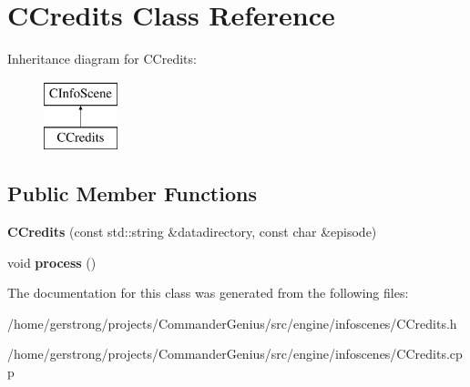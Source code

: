 \hypertarget{class_c_credits}{
\section{CCredits Class Reference}
\label{class_c_credits}
}
Inheritance diagram for CCredits:\begin{figure}[H]
\begin{center}
\leavevmode
\includegraphics[height=2cm]{class_c_credits}
\end{center}
\end{figure}
\subsection*{Public Member Functions}
\begin{DoxyCompactItemize}
\item 
\hypertarget{class_c_credits_acf94358ee383174aab4a5e1279a40e84}{
{\bfseries CCredits} (const std::string \&datadirectory, const char \&episode)}
\label{class_c_credits_acf94358ee383174aab4a5e1279a40e84}

\item 
\hypertarget{class_c_credits_a5d38335001eb146d13c4f9ab5c11ea6b}{
void {\bfseries process} ()}
\label{class_c_credits_a5d38335001eb146d13c4f9ab5c11ea6b}

\end{DoxyCompactItemize}


The documentation for this class was generated from the following files:\begin{DoxyCompactItemize}
\item 
/home/gerstrong/projects/CommanderGenius/src/engine/infoscenes/CCredits.h\item 
/home/gerstrong/projects/CommanderGenius/src/engine/infoscenes/CCredits.cpp\end{DoxyCompactItemize}
